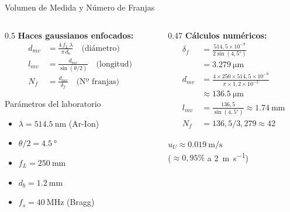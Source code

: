 \documentclass[aspectratio=169,12pt]{beamer}
\begin{document}
\begin{frame}{Volumen de Medida y Número de Franjas}
	\begin{columns}
		\begin{column}{0.5\textwidth}
			\textbf{Haces gaussianos enfocados:}
			\begin{align*}
				d_{mv} & = \frac{4\,f_L\,\lambda}{\pi\,d_b}
				\quad\text{(diámetro)}                      \\
				l_{mv} & = \frac{d_{mv}}{\sin(\theta/2)}
				\quad\text{(longitud)}                      \\
				N_f    & = \frac{d_{mv}}{\delta_f}
				\quad\text{(Nº franjas)}
			\end{align*}

			\vspace{0.3em}
			\begin{block}{Parámetros del laboratorio}
				\begin{itemize}\scriptsize
					\item $\lambda = \SI{514,5}{\nm}$ (Ar-Ion)
					\item $\theta/2 = \SI{4,5}{\degree}$
					\item $f_L = \SI{250}{\mm}$
					\item $d_b = \SI{1,2}{\mm}$
					\item $f_s = \SI{40}{\MHz}$ (Bragg)
				\end{itemize}
			\end{block}
		\end{column}
		\begin{column}{0.47\textwidth}
			\textbf{Cálculos numéricos:}
			\begin{align*}
				\delta_f & = \frac{514{,}5\!\times\!10^{-9}}{2\sin(4{,}5°)}      \\
				         & = \SI{3,279}{\micro\metre}                            \\[0.5em]
				d_{mv}   & = \frac{4 \times 250 \times 514{,}5\!\times\!10^{-9}}
				{\pi\times 1{,}2\!\times\!10^{-3}}                               \\
				         & \approx \SI{136,5}{\micro\metre}                      \\[0.5em]
				l_{mv}   & = \frac{136{,}5}{\sin(4{,}5°)}
				\approx \SI{1,74}{\mm}                                           \\[0.5em]
				N_f      & = 136{,}5 / 3{,}279 \approx 42
			\end{align*}

			\begin{alertblock}{}
				\centering
				$u_U \approx \SI{0,019}{\m\per\s}$\\
				($\approx 0{,}95\%$ a \SI{2}{\m\per\s})
			\end{alertblock}
		\end{column}
	\end{columns}
\end{frame}
\end{document}
